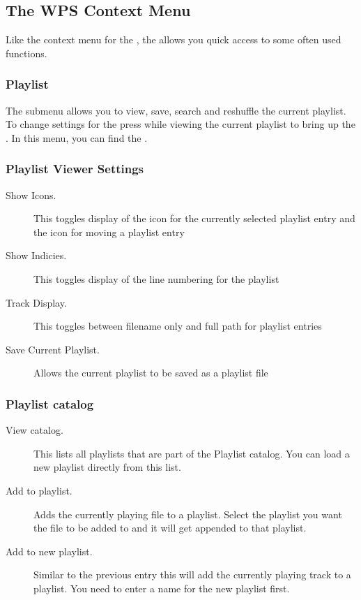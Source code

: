 \subsection{\label{sec:contextmenu}The WPS Context Menu}
Like the context menu for the , the  
allows you quick access to some often used functions.

\subsubsection{Playlist}
The  submenu allows you to view, save, search and
reshuffle the current playlist. To change settings for the
 press \ActionStdContext{} while viewing the current
playlist to bring up the . In this menu, you
can find the .

\subsubsection{Playlist Viewer Settings}
  \begin{description}
    \item[Show Icons.] This toggles display of the icon for the currently 
    selected playlist entry and the icon for moving a playlist entry
    \item[Show Indicies.] This toggles display of the line numbering for
       the playlist
    \item[Track Display.] This toggles between filename only and full path
       for playlist entries
    \item[Save Current Playlist.] Allows the current playlist to be saved as
       a  playlist file
  \end{description}

    
\subsubsection{Playlist catalog}
  \begin{description}
    \item [View catalog.] This lists all playlists that are part of the
    Playlist catalog. You can load a new playlist directly from this list.
    \item [Add to playlist.] Adds the currently playing file to a playlist.
    Select the playlist you want the file to be added to and it will get
    appended to that playlist.
    \item [Add to new playlist.] Similar to the previous entry this will
    add the currently playing track to a playlist. You need to enter a name
    for the new playlist first.
  \end{description}

